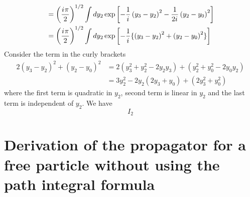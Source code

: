\begin{enumerate}
\begin{align*}
		&= \left(\frac{{i\mkern1mu} \pi}{2}\right)^{1/2} \int dy_2 \exp \left[-\frac{1}{{i\mkern1mu}} \left(y_3 - y_2\right)^2 -\frac{1}{2 {i\mkern1mu}} \left(y_2 - y_0\right)^2\right] \\
		&= \left(\frac{{i\mkern1mu} \pi}{2}\right)^{1/2} \int dy_2 \exp \left[-\frac{1}{{i\mkern1mu}} \{\left(y_3 - y_2\right)^2 + \left(y_2 - y_0\right)^2\}\right] \\
	\end{align*}
	Consider the term in the curly brackets
	\begin{align*}
		2\left(y_3 - y_2\right)^2 + \left(y_2 - y_0\right)^2 &= 2\left(y_3^2 + y_2^2 - 2y_2 y_3\right) + \left(y_2^2 + y_0^2 - 2 y_0 y_2\right) \\
		&= 3 y_2^2 - 2y_2 \left(2y_3 + y_0\right) + \left(2 y_3^2 + y_0^2\right)
	\end{align*}
	where the first term is quadratic in $y_2$, second term is linear in $y_2$ and the last term is independent of $y_2$. We have
	\begin{equation}
		I_2 
	\end{equation}
	
	
	\section{Derivation of the propagator for a free particle without using the path integral formula}

\end{enumerate}
